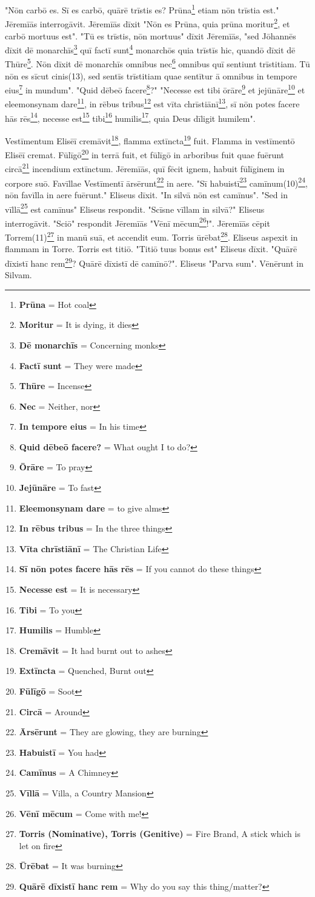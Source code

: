 "Nōn carbō es. Sī es carbō, quārē trīstis es? Prūna\footnote{\textbf{Prūna} = Hot coal} etiam nōn trīstia est." Jēremīās interrogāvit. Jēremīās dīxit "Nōn es Prūna, quia prūna moritur\footnote{\textbf{Moritur} = It is dying, it dies}, et carbō mortuus est". "Tū es trīstis, nōn mortuus" dīxit Jēremīās, "sed Jōhannēs dīxit dē monarchīs\footnote{\textbf{Dē monarchīs} = Concerning monks} quī factī sunt\footnote{\textbf{Factī sunt} = They were made} monarchōs quia trīstīs hic, quandō dīxit dē Thūre\footnote{\textbf{Thūre} = Incense}. Nōn dīxit dē monarchīs omnibus nec\footnote{\textbf{Nec} = Neither, nor} omnibus quī sentiunt trīstitiam. Tū nōn es sīcut cinis(13), sed sentīs trīstitiam quae sentītur ā omnibus in tempore eius\footnote{\textbf{In tempore eius} = In his time} in mundum". "Quid dēbeō facere\footnote{\textbf{Quid dēbeō facere?} = What ought I to do?}?" "Necesse est tibi ōrāre\footnote{\textbf{Ōrāre} = To pray} et jejūnāre\footnote{\textbf{Jejūnāre} = To fast} et eleemonsynam dare\footnote{\textbf{Eleemonsynam dare} = to give alms}, in rēbus tribus\footnote{\textbf{In rēbus tribus} = In the three things} est vīta chrīstiānī\footnote{\textbf{Vīta chrīstiānī} = The Christian Life}, sī nōn potes facere hās rēs\footnote{\textbf{Sī nōn potes facere hās rēs} = If you cannot do these things}, necesse est\footnote{\textbf{Necesse est} = It is necessary} tibi\footnote{\textbf{Tibi} = To you} humilis\footnote{\textbf{Humilis} = Humble}, quia Deus dīligit humilem".\par 
Vestīmentum Elisēī cremāvit\footnote{\textbf{Cremāvit} = It had burnt out to ashes}, flamma extīncta\footnote{\textbf{Extīncta} = Quenched, Burnt out} fuit. Flamma in vestīmentō Elisēī cremat. Fūlīgō\footnote{\textbf{Fūlīgō} = Soot} in terrā fuit, et fūlīgō in arboribus fuit quae fuērunt circā\footnote{\textbf{Circā} = Around} incendium extīnctum. Jēremīās, quī fēcit ignem, habuit fūlīginem in corpore suō. Favīllae Vestīmentī ārsērunt\footnote{\textbf{Ārsērunt} = They are glowing, they are burning} in aere. "Sī habuistī\footnote{\textbf{Habuistī} = You had} camīnum(10)\footnote{\textbf{Camīnus} = A Chimney}, nōn favīlla in aere fuērunt." Eliseus dīxit. "In silvā nōn est camīnus". "Sed in vīllā\footnote{\textbf{Vīllā} = Villa, a Country Mansion} est camīnus" Eliseus respondit. "Scīsne vīllam in silvā?" Eliseus interrogāvit. "Sciō" respondit Jēremīās "Vēnī mēcum\footnote{\textbf{Vēnī mēcum} = Come with me!}!". Jēremīās cēpit Torrem(11)\footnote{\textbf{Torris (Nominative), Torris (Genitive)} = Fire Brand, A stick which is let on fire} in manū suā, et accendit eum. Torris ūrēbat\footnote{\textbf{Ūrēbat} = It was burning}. Eliseus aspexit in flammam in Torre. Torris est titiō. "Titiō tuus bonus est" Eliseus dīxit. "Quārē dīxistī hanc rem\footnote{\textbf{Quārē dīxistī hanc rem} = Why do you say this thing/matter?}? Quārē dīxistī dē camīnō?". Eliseus "Parva sum". Vēnērunt in Silvam. 

